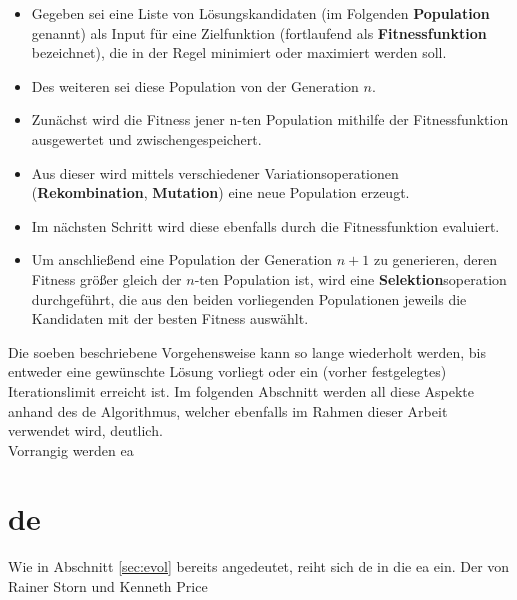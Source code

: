 	\begin{itemize}
		\item Gegeben sei eine Liste von Lösungskandidaten (im Folgenden \textbf{Population} genannt) als Input für eine Zielfunktion (fortlaufend als \textbf{Fitnessfunktion} bezeichnet), die in der Regel minimiert oder maximiert werden soll.
		\item Des weiteren sei diese Population von der Generation $n$.
		\item Zunächst wird die Fitness jener n-ten Population mithilfe der Fitnessfunktion ausgewertet und zwischengespeichert. 
		\item Aus dieser wird mittels verschiedener Variationsoperationen (\textbf{Rekombination}, \textbf{Mutation}) eine neue Population  erzeugt.
		\item Im nächsten Schritt wird diese ebenfalls durch die Fitnessfunktion evaluiert.
		\item Um anschließend eine Population der Generation $n+1$ zu generieren, deren Fitness größer gleich der $n$-ten Population ist, wird eine \textbf{Selektion}soperation durchgeführt, die aus den beiden vorliegenden Populationen jeweils die Kandidaten mit der besten Fitness auswählt.
	\end{itemize}
	
	Die soeben beschriebene Vorgehensweise kann so lange wiederholt werden, 
	bis entweder eine gewünschte Lösung vorliegt oder ein (vorher 
	festgelegtes) Iterationslimit erreicht ist. Im folgenden Abschnitt 
	werden all diese Aspekte anhand des \gls{de} Algorithmus, welcher 
	ebenfalls im Rahmen dieser Arbeit verwendet wird, deutlich.\\
	
	Vorrangig werden \gls{ea}


	\section{\gls{de}}
	\label{sec:de}

		Wie in Abschnitt \ref{sec:evol} bereits angedeutet, reiht sich \gls{de} in die \gls{ea} ein. Der von Rainer Storn und Kenneth Price \cite{storn-price-de} 